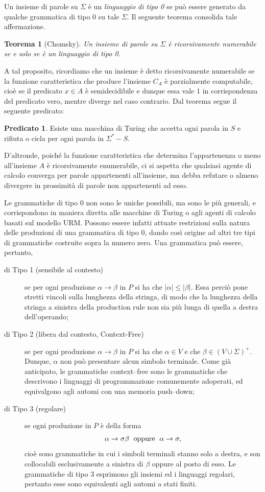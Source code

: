\documentclass[10pt]{\classname}
\newtheorem{thm}{Teorema}
\theoremstyle{definition}
\theoremstyle{definition}
\theoremstyle{definition}
\theoremstyle{definition}
\newtheorem{predicato}{Predicato}[section]
\begin{document}
Un insieme di parole su $\Sigma$ è un \emph{linguaggio di tipo 0} se può essere
generato da qualche grammatica di tipo 0 su tale $\Sigma$. Il seguente teorema
consolida tale affermazione.
\begin{thm}[Chomsky]
    Un insieme di parole su $\Sigma$ è \emph{ricorsivamente numerabile} se e
    solo se è un linguaggio di tipo 0.
\end{thm}
A tal proposito, ricordiamo che un insieme è detto ricorsivamente numerabile se la funzione caratteristica che produce l'insieme $C_A$ è parzialmente computabile, cioè se il predicato $x \in A$ è semidecidibile e dunque essa vale $1$ in corrispondenza del predicato vero, mentre diverge nel caso contrario. Dal teorema segue il seguente predicato:
\begin{predicato}
    Esiste una macchina di Turing che accetta ogni parola in $S$ e rifiuta o cicla per ogni parola in $\Sigma^* - S$.
\end{predicato}
D'altronde, poiché la funzione caratteristica che determina l'appartenenza o meno all'insieme $A$ è ricorsivamente enumerabile, ci si aspetta che qualsiasi agente di calcolo converga per parole appartenenti all'insieme, ma debba refutare o almeno divergere in prossimità di parole non appartenenti ad esso.

Le grammatiche di tipo 0 non sono le uniche possibili, ma sono le più generali, e corrispondono in maniera diretta alle macchine di Turing o agli agenti di calcolo basati sul modello URM. Possono essere infatti attuate restrizioni sulla natura delle produzioni di una grammatica di tipo 0, dando così origine ad altri tre tipi di grammatiche costruite sopra la numero zero. Una grammatica può essere, pertanto,
\begin{description}
    \item[di Tipo 1 (sensibile al contesto)] se per ogni produzione $\alpha \rightarrow \beta$ in $P$ si ha che $|\alpha| \leq |\beta|$. Essa perciò pone stretti vincoli sulla lunghezza della stringa, di modo che la lunghezza della stringa a sinistra della production rule non sia più lunga di quella a destra dell'operando;
    \item[di Tipo 2 (libera dal contesto, Context-Free)] se per ogni produzione $\alpha \rightarrow \beta$ in $P$ si ha che $\alpha \in V$ e che $\beta \in (V \cup \Sigma)^+$. Dunque, $\alpha$ non può presentare alcun simbolo terminale. Come già anticipato, le grammatiche context--free sono le grammatiche che descrivono i linguaggi di programmazione comunemente adoperati, ed equivalgono agli automi con una memoria push--down;
    \item[di Tipo 3 (regolare)] se ogni produzione in $P$ è della forma \[\alpha \rightarrow \sigma \beta \hspace*{0.1cm}\mbox{ oppure }\hspace*{0.1cm} \alpha \rightarrow \sigma,\] cioè sono grammatiche in cui i simboli terminali stanno solo a destra, e son collocabili esclusivamente a sinistra di $\beta$ oppure al posto di esso. Le grammatiche di tipo 3 esprimono gli insiemi ed i linguaggi regolari, pertanto esse sono equivalenti agli automi a stati finiti.
\end{description}
\end{document}
